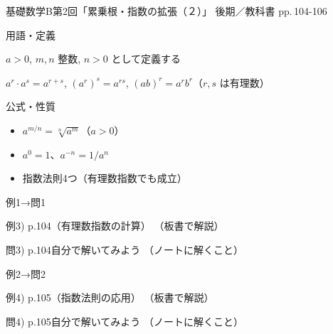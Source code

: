 \documentclass[aspectratio=43,professionalfonts,handout]{beamer}
\newcommand{\LectureNum}{2}
\newcommand{\LectureTitle}{累乗根・指数の拡張（２）}
\newcommand{\TextPages}{pp.\,104-106}
\newcommand{\CourseName}{基礎数学B}
\renewcommand{\TermName}{後期}
\begin{document}
\begin{frame}{\CourseName\quad 第\LectureNum 回「\LectureTitle 」}
  {\small \TermName\quad \TeacherName\quad ／\quad 教科書 \TextPages}

  \begin{block}{用語・定義}
  \begin{description}[labelwidth=5.5em]
    \item[\kw{有理数指数：$a^{m/n} = \sqrt[n]{a^m}$}] $a > 0$, $m,n$ 整数, $n > 0$ として定義する
    \item[\kw{指数法則（$a^m \cdot a^n = a^{m+n}$ など）の拡張}] $a^r \cdot a^s = a^{r+s}$, $(a^r)^s = a^{rs}$, $(ab)^r = a^r b^r$（$r,s$ は有理数）
  \end{description}
  \end{block}
\end{frame}

\begin{frame}{公式・性質}
  \begin{block}{}
  \begin{itemize}
    \item $a^{m/n} = \sqrt[n]{a^m}$（$a > 0$）
    \item $a^0 = 1$、$a^{-n} = 1/a^n$
    \item 指数法則4つ（有理数指数でも成立）
  \end{itemize}
  \end{block}
\end{frame}

\begin{frame}{例1→問1}
  \begin{exampleblock}{例3) p.104（有理数指数の計算）}
    （板書で解説）
  \end{exampleblock}

  \vfill

  \begin{block}{問3) p.104\quad 自分で解いてみよう}
    （ノートに解くこと）
  \end{block}
\end{frame}

\begin{frame}{例2→問2}
  \begin{exampleblock}{例4) p.105（指数法則の応用）}
    （板書で解説）
  \end{exampleblock}

  \vfill

  \begin{block}{問4) p.105\quad 自分で解いてみよう}
    （ノートに解くこと）
  \end{block}
\end{frame}
\end{document}
